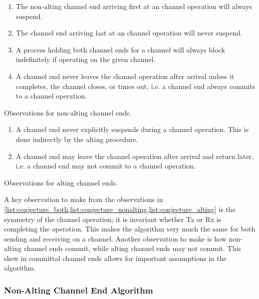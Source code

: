 \begin{enumeratefloat}
    \begin{enumerate}[topsep=0em,itemsep=-1em,partopsep=0.5em,parsep=1em]
        \item The non\hyp{}alting channel end arriving first at an channel operation will always suspend.
        \item The channel end arriving last at an channel operation will never suspend.
        \item A process holding both channel ends for a channel will always block indefinitely if operating on the given channel.
        \item A channel end never leaves the channel operation after arrival unless it completes, the channel closes, or times out, i.e. a channel end always commits to a channel operation.
    \end{enumerate}
    \caption{Observations for non\hyp{}alting channel ends.}
    \label{list:conjecture_nonalting}
\end{enumeratefloat}

\begin{enumeratefloat}
    \begin{enumerate}[topsep=0em,itemsep=-1em,partopsep=0.5em,parsep=1em]
        \item A channel end never explicitly suspends during a channel operation. This is done indirectly by the alting procedure.
        \item A channel end may leave the channel operation after arrival and return later, i.e. a channel end may not commit to a channel operation.
    \end{enumerate}
    \caption{Observations for alting channel ends.}
    \label{list:conjecture_alting}
\end{enumeratefloat}

\FloatBarrier

A key observation to make from the observations in \cref{list:conjecture_both,list:conjecture_nonalting,list:conjecture_alting} is the symmetry of the channel operation; it is invariant whether Tx or Rx is completing the operation. This makes the algorithm very much the same for both sending and receiving on a channel. Another observation to make is how non\hyp{}alting channel ends commit, while alting channel ends may not commit. This skew in committal channel ends allows for important assumptions in the algorithm.


\subsubsection{Non\hyp{}Alting Channel End Algorithm}

